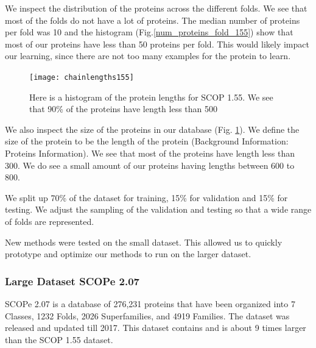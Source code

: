 \documentclass[12pt, a4paper, twocolumn, fullpage]{article}
\theoremstyle{plain}
\theoremstyle{definition}
\theoremstyle{remark}
\begin{document}
We inspect the distribution of the proteins across the different folds. We see that most of the folds do not have a lot of proteins. The median number of proteins per fold was 10 and the histogram (Fig.\ref{num_proteins_fold_155}) show that most of our proteins have less than 50 proteins per fold. This would likely impact our learning, since there are not too many examples for the protein to learn.


\begin{figure}[t]
    \texttt{[image: chainlengths155]}
    \caption{Here is a histogram of the protein lengths for SCOP 1.55. We see that 90\% of the proteins have length less than 500}
    \label{chainlengths155}
\end{figure}

We also inspect the size of the proteins in our database (Fig. \ref{chainlengths155}). We define the size of the protein to be the length of the protein (Background Information: Proteins Information). We see that most of the proteins have length less than 300. We do see a small amount of our proteins having lengths between 600 to 800. 

We split up 70\% of the dataset for training, 15\% for validation and 15\% for testing. We adjust the sampling of the validation and testing so that a wide range of folds are represented.

New methods were tested on the small dataset. This allowed us to quickly prototype and optimize our methods to run on the larger dataset.

\subsubsection{Large Dataset SCOPe 2.07}

SCOPe 2.07 is a database of 276,231 proteins that have been organized into 7 Classes, 1232 Folds, 2026 Superfamilies, and 4919 Families. The dataset was released and updated till 2017. This dataset contains and is about 9 times larger than the SCOP 1.55 dataset.
\end{document}
